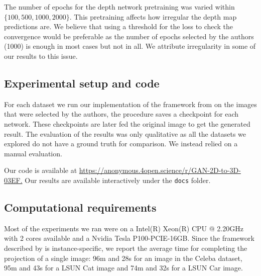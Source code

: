 The number of epochs for the depth network pretraining was varied within $\{100, 500, 1000, 2000\}$. This pretraining affects how irregular the depth map predictions are. We believe that using a threshold for the loss to check the convergence would be preferable as the number of epochs selected by the authors (1000) is enough in most cases but not in all. We attribute irregularity in some of our results to this issue. 

\subsection{Experimental setup and code}
For each dataset we run our implementation of the framework from \cite{gan2shape} on the images that were selected by the authors, the procedure saves a checkpoint for each network. These checkpoints are later fed the original image to get the generated result. The evaluation of the results was only qualitative as all the datasets we explored do not have a ground truth for comparison. We instead relied on a manual evaluation.

Our code is available at \url{https://anonymous.4open.science/r/GAN-2D-to-3D-03EF.} Our results are available interactively under the \lstinline{docs} folder.
\subsection{Computational requirements}
Most of the experiments we ran were on a Intel(R) Xeon(R) CPU @ 2.20GHz with 2 cores available and a Nvidia Tesla P100-PCIE-16GB. Since the framework described by \cite{gan2shape} is instance-specific, we report the average time for completing the projection of a single image: 96m and 28s for an image in the Celeba dataset, 95m and 43s for a LSUN Cat image and 74m and 32s for a LSUN Car image.
